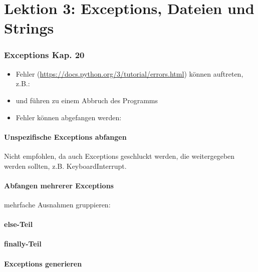 \part{Lektion 3: Exceptions, Dateien und Strings}
\section[Exceptions]{Exceptions \tiny{Kap. 20}}
\begin{itemize}
	\item Fehler (\url{https://docs.python.org/3/tutorial/errors.html}) können auftreten, z.B.:
	
	\item und führen zu einem Abbruch des Programms
	\item Fehler können abgefangen werden:
	
\end{itemize}

\subsection{Unspezifische Exceptions abfangen}
Nicht empfohlen, da auch Exceptions geschluckt werden, die weitergegeben werden sollten, z.B. KeyboardInterrupt.\\


\subsection{Abfangen mehrerer Exceptions}

mehrfache Ausnahmen gruppieren:\\


\subsection{else-Teil}


\subsection{finally-Teil}


\subsection{Exceptions generieren}



